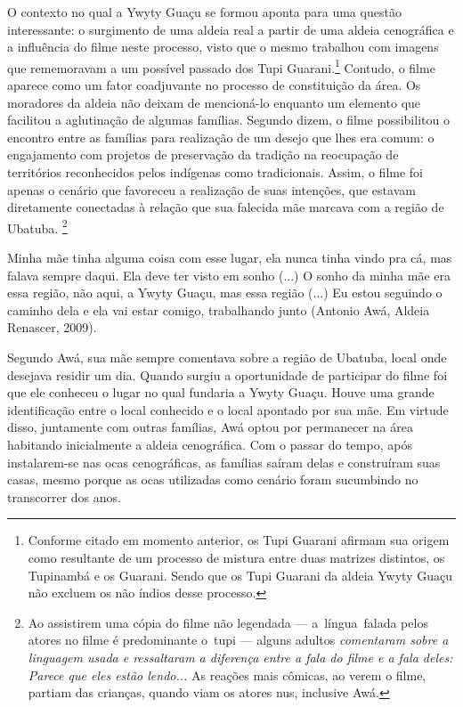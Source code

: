 \documentclass{article}
\begin{document}
O contexto no qual a Ywyty Gua\c{c}u se formou aponta para uma quest\~ao
interessante: o surgimento de uma aldeia real a partir de uma aldeia
cenogr\'afica e a influ\^encia do filme neste processo, visto que o
mesmo trabalhou com imagens que rememoravam a um poss\'ivel passado dos
Tupi Guarani.\footnote{ Conforme citado em momento anterior, os Tupi
Guarani afirmam sua origem como resultante de um processo de mistura
entre duas matrizes distintos, os Tupinamb\'a e os Guarani. Sendo que
os Tupi Guarani da aldeia Ywyty Gua\c{c}u n\~ao excluem os n\~ao
\'indios desse processo.} Contudo, o filme aparece como um fator
coadjuvante no processo de constitui\c{c}\~ao da \'area. Os moradores
da aldeia n\~ao deixam de mencion\'a-lo enquanto um elemento que
facilitou a aglutina\c{c}\~ao de algumas fam\'ilias. Segundo dizem, o
filme possibilitou o encontro entre as fam\'ilias para realiza\c{c}\~ao
de um desejo que lhes era comum: o engajamento com projetos de
preserva\c{c}\~ao da tradi\c{c}\~ao na reocupa\c{c}\~ao de
territ\'orios reconhecidos pelos ind\'igenas como tradicionais. Assim,
o filme foi apenas o cen\'ario que favoreceu a realiza\c{c}\~ao de suas
inten\c{c}\~oes, que estavam diretamente conectadas \`a rela\c{c}\~ao
que sua falecida m\~ae marcava com a regi\~ao de Ubatuba. \footnote{ Ao
assistirem uma c\'opia do filme n\~ao legendada --- a~l\'ingua~falada
pelos atores no filme \'e predominante o~tupi {}--- alguns adultos
\emph{comentaram sobre a linguagem usada e ressaltaram a diferen\c{c}a
entre a fala do filme e a fala deles:}\emph{ Parece que eles est\~ao
lendo... }As rea\c{c}\~oes mais c\^omicas, ao verem o filme, partiam
das crian\c{c}as, quando viam os atores nus, inclusive Aw\'a.}

Minha m\~ae tinha alguma coisa com esse lugar, ela nunca tinha vindo pra
c\'a, mas falava sempre daqui. Ela deve ter visto em sonho (...) O
sonho da minha m\~ae era essa regi\~ao, n\~ao aqui, a Ywyty Gua\c{c}u,
mas essa regi\~ao (...) Eu estou seguindo o caminho dela e ela vai
estar comigo, trabalhando junto (Antonio Aw\'a, Aldeia Renascer, 2009).

Segundo Aw\'a, sua m\~ae sempre comentava sobre a regi\~ao de Ubatuba,
local onde desejava residir um dia. Quando surgiu a oportunidade de
participar do filme foi que ele conheceu o lugar no qual fundaria a
Ywyty Gua\c{c}u. Houve uma grande identifica\c{c}\~ao entre o local
conhecido e o local apontado por sua m\~ae. Em virtude disso,
juntamente com outras fam\'ilias, Aw\'a optou por permanecer na \'area
habitando inicialmente a aldeia cenogr\'afica. Com o passar do tempo,
ap\'os instalarem-se nas ocas cenogr\'aficas, as fam\'ilias sa\'iram
delas e constru\'iram suas casas, mesmo porque as ocas utilizadas como
cen\'ario foram sucumbindo no transcorrer dos anos. 
\end{document}
